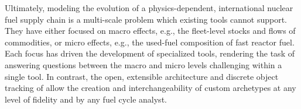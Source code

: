 Ultimately, modeling the evolution of a physics-dependent, international
nuclear fuel supply chain is a multi-scale problem which existing tools cannot
support. They have either focused on macro effects, e.g., the fleet-level
stocks and flows of commodities, or micro effects, e.g., the used-fuel
composition of fast reactor fuel. Each focus has driven the development of
specialized tools, rendering the task of answering questions between the macro
and micro levels challenging within a single tool.  In contrast, the open, extensible
architecture and discrete object tracking of \Cyclus allow the creation and
interchangeability of custom archetypes at any level of fidelity and by any
fuel cycle analyst.



